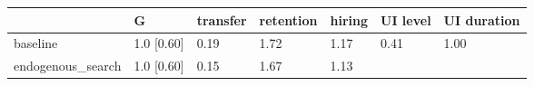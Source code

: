 \begin{tabular}{lllllll}
\toprule
 & \textbf{G} & \textbf{transfer} & \textbf{retention} & \textbf{hiring} & \textbf{UI level} & \textbf{UI duration} \\
\midrule
baseline & 1.0 [0.60] & 0.19 & 1.72 & 1.17 & 0.41 & 1.00 \\
endogenous_search & 1.0 [0.60] & 0.15 & 1.67 & 1.13 &  &  \\
\bottomrule
\end{tabular}
